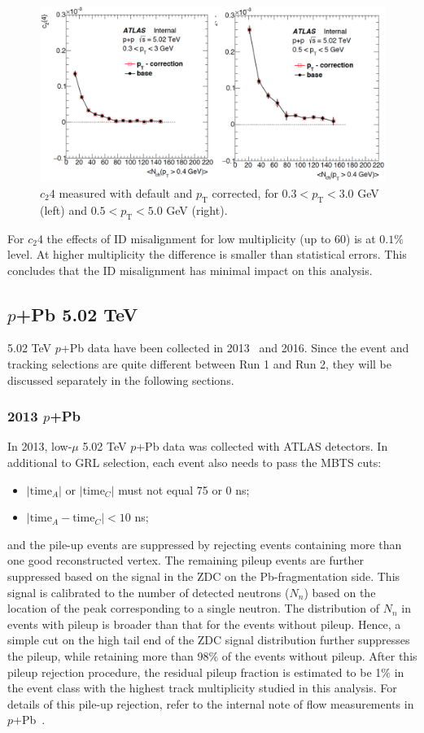 \begin{figure}
\centering
\includegraphics[width=1.\linewidth]{figs/sec_evtSlc/ID_alignment_pp5.png}
\caption{$c_{2}{4}$ measured with default and $p_{\text{T}}$ corrected, for $0.3<p_{\text{T}}<3.0$ GeV (left) and $0.5<p_{\text{T}}<5.0$ GeV (right).}
\label{fig:ID_alignment_pp5}
\end{figure}
For $c_{2}{4}$ the effects of ID misalignment for low multiplicity (up to 60) is at $0.1\%$ level. At higher multiplicity the difference is smaller than statistical errors. This concludes that the ID misalignment has minimal impact on this analysis.

\subsection{$p$+Pb 5.02 TeV}
5.02 TeV $p$+Pb data have been collected in 2013~\cite{Aad:2012bu} and 2016. Since the event and tracking selections are quite different between Run 1 and Run 2, they will be discussed separately in the following sections.

\subsubsection{2013 $p$+Pb}
In 2013, low-$\mu$ 5.02 TeV $p$+Pb data was collected with ATLAS detectors. In additional to GRL selection, each event also needs to pass the MBTS cuts:
\begin{itemize}
\item $|\text{time}_{A}|$ or $|\text{time}_{C}|$ must not equal 75 or 0 ns;
\item $|\text{time}_{A}-\text{time}_{C}|<10$ ns;
\end{itemize}
and the pile-up events are suppressed by rejecting events containing more than one good reconstructed vertex. The remaining pileup events are further suppressed based on the signal in the ZDC on the Pb-fragmentation side. This signal is calibrated to the number of detected neutrons ($N_{n}$) based on the location of the peak corresponding to a single neutron. The distribution of $N_{n}$ in events with pileup is broader than that for the events without pileup. Hence, a simple cut on the high tail end of the ZDC signal distribution further suppresses the pileup, while retaining more than 98$\%$ of the events without pileup. After this pileup rejection procedure, the residual pileup fraction is estimated to be 1$\%$ in the event class with the highest track multiplicity studied in this analysis. For details of this pile-up rejection, refer to the internal note of flow measurements in $p$+Pb~\cite{atlas:9}.

